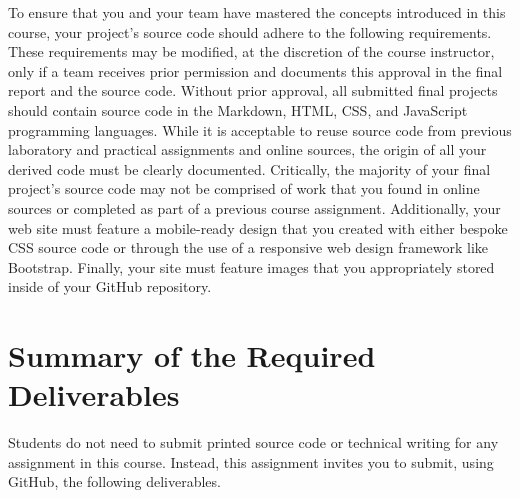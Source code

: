 \documentclass[11pt]{article}
\begin{document}
To ensure that you and your team have mastered the concepts introduced in this
course, your project's source code should adhere to the following requirements.
These requirements may be modified, at the discretion of the course instructor,
only if a team receives prior permission and documents this approval in the
final report and the source code. Without prior approval, all submitted final
projects should contain source code in the Markdown, HTML, CSS, and JavaScript
programming languages. While it is acceptable to reuse source code from previous
laboratory and practical assignments and online sources, the origin of all your
derived code must be clearly documented. Critically, the majority of your final
project's source code may not be comprised of work that you found in online
sources or completed as part of a previous course assignment. Additionally, your
web site must feature a mobile-ready design that you created with either bespoke
CSS source code or through the use of a responsive web design framework like
Bootstrap. Finally, your site must feature images that you appropriately stored
inside of your GitHub repository.

\section*{Summary of the Required Deliverables}

\noindent Students do not need to submit printed source code or technical
writing for any assignment in this course. Instead, this assignment invites you
to submit, using GitHub, the following deliverables.

\vspace*{-0.05in}
\end{document}
